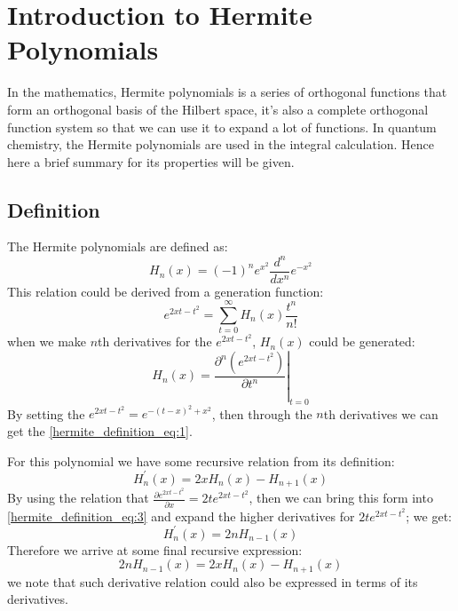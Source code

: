 %
%
%
%

\chapter{Introduction to Hermite Polynomials}
\label{sec:hermite_polynomials}

In the mathematics, Hermite polynomials is a series of orthogonal functions
that form an orthogonal basis of the Hilbert space, it's also a complete 
orthogonal function system so that we can use it to expand a lot of functions.
In quantum chemistry, the Hermite polynomials are used in the integral
calculation. Hence here a brief summary for its properties will be given.

\section{Definition}
The Hermite polynomials are defined as:
\begin{equation}
 \label{hermite_definition_eq:1}
H_{n}(x) = (-1)^{n}e^{x^{2}}\frac{d^{n}}{dx^{n}}e^{-x^{2}}
\end{equation}
This relation could be derived from a generation function:
\begin{equation}
\label{hermite_definition_eq:2}
 e^{2xt-t^{2}} = \sum_{t=0}^{\infty}H_{n}(x)\frac{t^{n}}{n!}
\end{equation}
when we make $n$th derivatives for the $e^{2xt-t^{2}}$, $H_{n}(x)$
could be generated:
\begin{equation}
 \label{hermite_definition_eq:3}
H_{n}(x) =  \left. \frac{\partial^{n} (e^{2xt-t^{2}}) }{\partial
t^{n}}\right|_{t=0}
\end{equation}
By setting the $e^{2xt-t^{2}} = e^{-(t-x)^{2} + x^{2}}$, then through
the $n$th derivatives we can get the \ref{hermite_definition_eq:1}.

For this polynomial we have some recursive relation from its definition:
\begin{equation}
 \label{hermite_definition_eq:4}
H_{n}^{'}(x) = 2xH_{n}(x) - H_{n+1}(x)
\end{equation}
By using the relation that $\frac{\partial 
e^{2xt-t^{2}} }{\partial x} = 2te^{2xt-t^{2}}$, then we can bring this form
into \ref{hermite_definition_eq:3} and expand the higher derivatives for
$2te^{2xt-t^{2}}$; we get:
\begin{equation}
 \label{hermite_definition_eq:5}
H_{n}^{'}(x) = 2nH_{n-1}(x)
\end{equation}
Therefore we arrive at some final recursive expression:
\begin{equation}
 \label{hermite_definition_eq:6}
2nH_{n-1}(x) = 2xH_{n}(x) - H_{n+1}(x)
\end{equation}
we note that such derivative relation could also be expressed in terms of 
its derivatives. 


